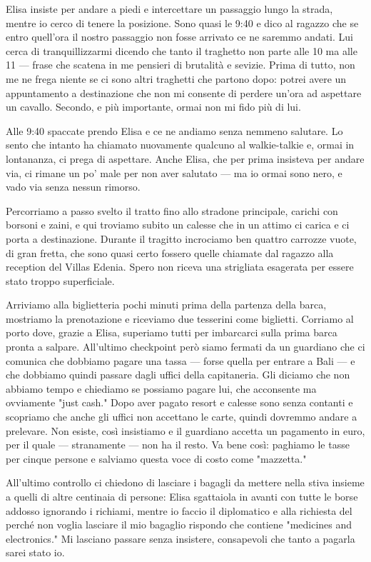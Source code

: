 Elisa insiste per andare a piedi e intercettare un passaggio lungo la strada, mentre io cerco di tenere la posizione. Sono quasi le 9:40 e dico al ragazzo che se entro quell'ora il nostro passaggio non fosse arrivato ce ne saremmo andati. Lui cerca di tranquillizzarmi dicendo che tanto il traghetto non parte alle 10 ma alle 11 — frase che scatena in me pensieri di brutalità e sevizie. Prima di tutto, non me ne frega niente se ci sono altri traghetti che partono dopo: potrei avere un appuntamento a destinazione che non mi consente di perdere un'ora ad aspettare un cavallo. Secondo, e più importante, ormai non mi fido più di lui.

Alle 9:40 spaccate prendo Elisa e ce ne andiamo senza nemmeno salutare. Lo sento che intanto ha chiamato nuovamente qualcuno al walkie-talkie e, ormai in lontananza, ci prega di aspettare. Anche Elisa, che per prima insisteva per andare via, ci rimane un po' male per non aver salutato — ma io ormai sono nero, e vado via senza nessun rimorso.

Percorriamo a passo svelto il tratto fino allo stradone principale, carichi con borsoni e zaini, e qui troviamo subito un calesse che in un attimo ci carica e ci porta a destinazione. Durante il tragitto incrociamo ben quattro carrozze vuote, di gran fretta, che sono quasi certo fossero quelle chiamate dal ragazzo alla reception del Villas Edenia. Spero non riceva una strigliata esagerata per essere stato troppo superficiale.

Arriviamo alla biglietteria pochi minuti prima della partenza della barca, mostriamo la prenotazione e riceviamo due tesserini come biglietti. Corriamo al porto dove, grazie a Elisa, superiamo tutti per imbarcarci sulla prima barca pronta a salpare. All'ultimo checkpoint però siamo fermati da un guardiano che ci comunica che dobbiamo pagare una tassa — forse quella per entrare a Bali — e che dobbiamo quindi passare dagli uffici della capitaneria. Gli diciamo che non abbiamo tempo e chiediamo se possiamo pagare lui, che acconsente ma ovviamente "just cash." Dopo aver pagato resort e calesse sono senza contanti e scopriamo che anche gli uffici non accettano le carte, quindi dovremmo andare a prelevare. Non esiste, così insistiamo e il guardiano accetta un pagamento in euro, per il quale — stranamente — non ha il resto. Va bene così: paghiamo le tasse per cinque persone e salviamo questa voce di costo come "mazzetta."

All'ultimo controllo ci chiedono di lasciare i bagagli da mettere nella stiva insieme a quelli di altre centinaia di persone: Elisa sgattaiola in avanti con tutte le borse addosso ignorando i richiami, mentre io faccio il diplomatico e alla richiesta del perché non voglia lasciare il mio bagaglio rispondo che contiene "medicines and electronics." Mi lasciano passare senza insistere, consapevoli che tanto a pagarla sarei stato io.

